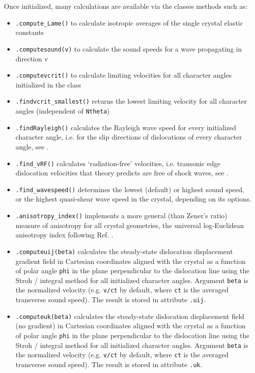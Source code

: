 \documentclass[11pt,letterpaper,oneside,pdftex]{article}
\begin{document}
Once initialized, many calculations are available via the classes methods such as:
\begin{itemize}
\item \verb|.compute_Lame()| to calculate isotropic averages of the single crystal elastic constants

\item \verb|.computesound(v)| to calculate the sound speeds for a wave propagating in direction v

\item \verb|.computevcrit()| to calculate limiting velocities for all character angles initialized in the class

\item \verb|.findvcrit_smallest()| returns the lowest limiting velocity for all character angles (independent of \verb|Ntheta|)

\item \verb|.findRayleigh()| calculates the Rayleigh wave speed for every initialized character angle, i.e. for the slip directions of dislocations of every character angle, see \cite{Barnett:1973b}.

\item \verb|.find_vRF()| calculates `radiation-free' velocities, i.e. transonic edge dislocation velocities that theory predicts are free of shock waves, see \cite{Gao:1999,Blaschke:2023rad}.

\item \verb|.find_wavespeed()| determines the lowest (default) or highest sound speed, or the highest quasi-shear wave speed in the crystal, depending on its options.

\item \verb|.anisotropy_index()| implements a more general (than Zener's ratio) measure of anisotropy for all crystal geometries, the universal log-Euclidean anisotropy index following Ref. \cite{Kube:2016anis}.

\item \verb|.computeuij(beta)| calculates the steady-state dislocation displacement gradient field in Cartesian coordinates aligned with the crystal as a function of polar angle \verb|phi| in the plane perpendicular to the dislocation line using the Stroh / integral method \cite{Bacon:1980} for all initialized character angles.
Argument \verb|beta| is the normalized velocity (e.g. \verb|v/ct| by default, where \verb|ct| is the averaged transverse sound speed).
The result is stored in attribute \verb|.uij|.

\item \verb|.computeuk(beta)| calculates the steady-state dislocation displacement field (no gradient) in Cartesian coordinates aligned with the crystal as a function of polar angle \verb|phi| in the plane perpendicular to the dislocation line using the Stroh / integral method \cite{Bacon:1980} for all initialized character angles.
Argument \verb|beta| is the normalized velocity (e.g. \verb|v/ct| by default, where \verb|ct| is the averaged transverse sound speed).
The result is stored in attribute \verb|.uk|.


\end{itemize}
\end{document}
